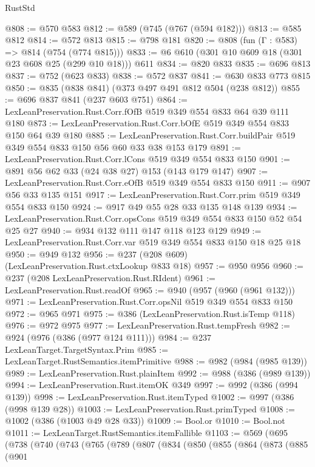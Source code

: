 \begin{lexlean}{RustStd}
\begin{coremodule}
@808 := @570 @583
@812 := @589 (@745 (@767 (@594 @182)))
@813 := @585 @812
@814 := @572 @813
@815 := @798 @181
@820 := @808 (fun (Γ : @583) => @814 (@754 (@774 @815)))
@833 := @6 @610 (@301 @10 @609 @18 (@301 @23 @608 @25 (@299 @10 @18))) @611
@834 := @820 @833
@835 := @696 @813
@837 := @752 (@623 @833)
@838 := @572 @837
@841 := @630 @833 @773 @815
@850 := @835 (@838 @841) (@373 @497 @491 @812 @504 (@238 @812))
@855 := @696 @837 @841 (@237 @603 @751)
@864 := LexLeanPreservation.Rust.Corr.fOfB @519 @349 @554 @833 @64 @39 @111 @180
@873 := LexLeanPreservation.Rust.Corr.bOfE @519 @349 @554 @833 @150 @64 @39 @180
@885 := LexLeanPreservation.Rust.Corr.buildPair @519 @349 @554 @833 @150 @56 @60 @33 @38 @153 @179
@891 := LexLeanPreservation.Rust.Corr.lCons @519 @349 @554 @833 @150
@901 := @891 @56 @62 @33 (@24 @38 @27) @153 (@143 @179 @147)
@907 := LexLeanPreservation.Rust.Corr.eOfB @519 @349 @554 @833 @150
@911 := @907 @56 @33 @135 @151
@917 := LexLeanPreservation.Rust.Corr.prim @519 @349 @554 @833 @150
@924 := @917 @49 @55 @28 @33 @135 @148 @139
@934 := LexLeanPreservation.Rust.Corr.opsCons @519 @349 @554 @833 @150 @52 @54 @25 @27
@940 := @934 @132 @111 @147 @118 @123 @129
@949 := LexLeanPreservation.Rust.Corr.var @519 @349 @554 @833 @150 @18 @25 @18
@950 := @949 @132
@956 := @237 (@208 @609) (LexLeanPreservation.Rust.ctxLookup @833 @18)
@957 := @950 @956
@960 := @237 (@208 LexLeanPreservation.Rust.RIdent)
@961 := LexLeanPreservation.Rust.readOf
@965 := @940 (@957 (@960 (@961 @132)))
@971 := LexLeanPreservation.Rust.Corr.opsNil @519 @349 @554 @833 @150
@972 := @965 @971
@975 := @386 (LexLeanPreservation.Rust.isTemp @118)
@976 := @972 @975
@977 := LexLeanPreservation.Rust.tempFresh
@982 := @924 (@976 (@386 (@977 @124 @111)))
@984 := @237 LexLeanTarget.TargetSyntax.Prim
@985 := LexLeanTarget.RustSemantics.itemPrimitive
@988 := @982 (@984 (@985 @139))
@989 := LexLeanPreservation.Rust.plainItem
@992 := @988 (@386 (@989 @139))
@994 := LexLeanPreservation.Rust.itemOK @349
@997 := @992 (@386 (@994 @139))
@998 := LexLeanPreservation.Rust.itemTyped
@1002 := @997 (@386 (@998 @139 @28))
@1003 := LexLeanPreservation.Rust.primTyped
@1008 := @1002 (@386 (@1003 @49 @28 @33))
@1009 := Bool.or
@1010 := Bool.not
@1011 := LexLeanTarget.RustSemantics.itemFallible
@1103 := @569
    (@695
      (@738
        (@740
          (@743
            (@765
              (@789
                (@807
                  (@834
                    (@850
                      (@855
                        (@864
                          (@873
                            (@885
                              (@901

\end{coremodule}
\end{lexlean}
